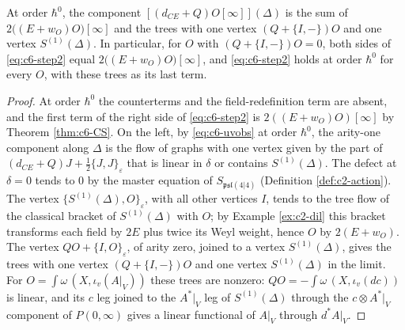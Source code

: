 
\begin{proposition}
\label{prop:c6-classical}
At order $\hbar^0$, the component $[(d_{CE}+Q)O[\infty]](\Delta)$ is the sum of $2\big((E+w_O)O\big)[\infty]$ and the trees with one vertex $(Q+\{I,-\})O$ and one vertex $S^{(1)}(\Delta)$. In particular, for $O$ with $(Q+\{I,-\})O=0$, both sides of \eqref{eq:c6-step2} equal $2\big((E+w_O)O\big)[\infty]$, and \eqref{eq:c6-step2} holds at order $\hbar^0$ for every $O$, with these trees as its last term.
\end{proposition}

\begin{proof}
At order $\hbar^0$ the counterterms and the field-redefinition term are absent, and the first term of the right side of \eqref{eq:c6-step2} is $2((E+w_O)O)[\infty]$ by Theorem \ref{thm:c6-CS}. On the left, by \eqref{eq:c6-uvobs} at order $\hbar^0$, the arity-one component along $\Delta$ is the flow of graphs with one vertex given by the part of $(d_{CE}+Q)J+\tfrac12\{J,J\}_\varepsilon$ that is linear in $\delta$ or contains $S^{(1)}(\Delta)$. The defect at $\delta=0$ tends to $0$ by the master equation of $S_{\mathfrak{psl}(4|4)}$ (Definition \ref{def:c2-action}). The vertex $\{S^{(1)}(\Delta),O\}_\varepsilon$, with all other vertices $I$, tends to the tree flow of the classical bracket of $S^{(1)}(\Delta)$ with $O$; by Example \ref{ex:c2-dil} this bracket transforms each field by $2E$ plus twice its Weyl weight, hence $O$ by $2(E+w_O)$. The vertex $QO+\{I,O\}_\varepsilon$, of arity zero, joined to a vertex $S^{(1)}(\Delta)$, gives the trees with one vertex $(Q+\{I,-\})O$ and one vertex $S^{(1)}(\Delta)$ in the limit. For $O=\int\omega\,(X,\iota_v(A|_V))$ these trees are nonzero: $QO=-\int\omega\,(X,\iota_v(dc))$ is linear, and its $c$ leg joined to the $A^*|_V$ leg of $S^{(1)}(\Delta)$ through the $c\otimes A^*|_V$ component of $P(0,\infty)$ gives a linear functional of $A|_V$ through $d^*A|_V$.
\end{proof}


